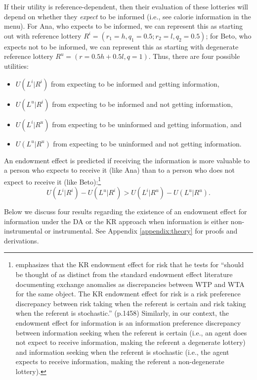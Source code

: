 If their utility is reference-dependent, then their evaluation of these lotteries will depend on whether they \emph{expect} to be informed (i.e., see calorie information in the menu). For Ana, who expects to be informed, we can represent this as starting out with reference lottery $R^i=(r_1=h,q_1=0.5;r_2=l,q_2=0.5)$; for Beto, who expects not to be informed, we can represent this as starting with degenerate reference lottery $R^u=(r=0.5h+0.5l,q=1)$. Thus, there are four possible utilities:
\begin{itemize}
	\item $U(L^i|R^i)$ from expecting to be informed and getting information,
	\item $U(L^u|R^i)$ from expecting to be informed and not getting information,
	\item $U(L^i|R^u)$ from expecting to be uninformed and getting information, and
  \item $U(L^u|R^u)$ from expecting to be uninformed and not getting information.
\end{itemize}

An endowment effect is predicted if receiving the information is more valuable to a person who expects to receive it (like Ana) than to a person who does not expect to receive it (like Beto):\footnote{\citet{sprengerEndowmentEffectRisk2015} emphasizes that the KR endowment effect for risk that he tests for \enquote{should be thought of as distinct from the standard endowment effect literature documenting exchange anomalies as discrepancies between WTP and WTA for the same object. The KR endowment effect for risk is a risk preference discrepancy between risk taking when the referent is certain and risk taking when the referent is stochastic.} (p.1458) Similarly, in our context, the endowment effect for information is an information preference discrepancy between information seeking when the referent is certain (i.e., an agent does not expect to receive information, making the referent a degenerate lottery) and information seeking when the referent is stochastic (i.e., the agent expects to receive information, making the referent a non-degenerate lottery).}
\begin{equation}
  U(L^i|R^i)-U(L^u|R^i)>U(L^i|R^u)-U(L^u|R^u).
  \label{eq:endowmentEffect}
\end{equation}

Below we discuss four results regarding the existence of an endowment effect for information under the DA or the KR approach when information is either non-instrumental or instrumental. See Appendix \ref{appendix:theory} for proofs and derivations.

